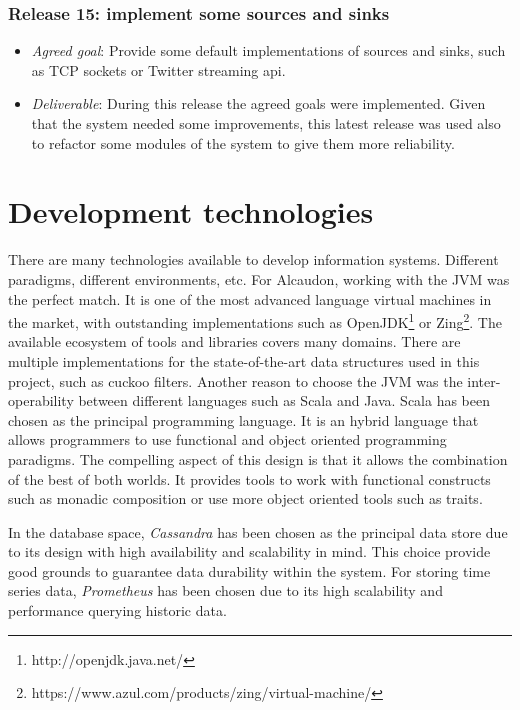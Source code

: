 \subsubsection{Release 15: implement some sources and sinks}
\begin{itemize}
\item \textit{Agreed goal}: Provide some default implementations of sources and
  sinks, such as TCP sockets or Twitter streaming api.
\item \textit{Deliverable}: During this release the agreed goals were implemented. Given
  that the system needed some improvements, this latest release was used also to refactor
  some modules of the system to give them more reliability.
\end{itemize}

\section{Development technologies}

There are many technologies available to develop information systems. Different
paradigms, different environments, etc. For Alcaudon, working with the \acs{JVM}
was the perfect match. It is one of the most advanced language virtual machines
in the market, with outstanding implementations such as
OpenJDK\footnote{http://openjdk.java.net/} or
Zing\footnote{https://www.azul.com/products/zing/virtual-machine/}. The
available ecosystem of tools and libraries covers many domains. There are
multiple implementations for the state-of-the-art data structures used in this
project, such as cuckoo filters\cite{cuckoo}. Another reason to choose the \acs{JVM}
was the inter-operability between different languages such as Scala and Java.
Scala has been chosen as the principal programming language. It is an hybrid
language that allows programmers to use functional and object oriented
programming paradigms. The compelling aspect of this design is that it allows
the combination of the best of both worlds. It provides tools to work with
functional constructs such as monadic composition or use more object oriented
tools such as traits.

In the database space, \textit{Cassandra} has been chosen as the principal data store due
to its design with high availability and scalability in mind. This choice
provide good grounds to guarantee data durability within the system. For storing
time series data, \textit{Prometheus} has been chosen due to its high scalability and
performance querying historic data.

